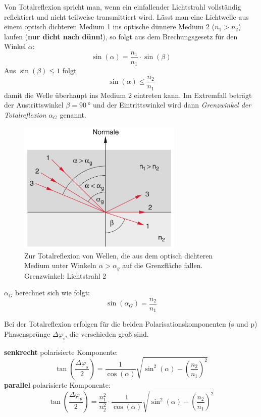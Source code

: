\documentclass[a4paper, 11pt, ngerman, parskip=half]{scrartcl}
\begin{document}
Von Totalreflexion spricht man, wenn ein einfallender Lichtstrahl vollständig reflektiert und nicht teilweise transmittiert wird.
Lässt man eine Lichtwelle aus einem optisch dichteren Medium 1 ins optische dünnere Medium 2 ($n_1 > n_2$) laufen (\textbf{nur dicht nach dünn!}), so folgt aus dem Brechungsgesetz für den Winkel $\alpha$:
%
\[\sin(\alpha) = \frac{n_1}{n_1} \cdot \sin(\beta)\]
%
Aus $\sin(\beta) \leq 1$ folgt
%
\[\sin(\alpha) \leq \frac{n_2}{n_1}\]
%
damit die Welle überhaupt ins Medium 2 eintreten kann. Im Extremfall beträgt der Austrittswinkel $\beta = \SI{90}{\degree}$ und der Eintrittswinkel wird dann \textit{Grenzwinkel der Totalreflexion} $\alpha_G$ genannt.
%
\begin{figure}[H]
    \centering
    \begin{samepage}
        \includegraphics[width=0.7\textwidth]{image/15/totalreflexion.jpg}
        \caption{Zur Totalreflexion von Wellen, die aus dem optisch
        dichteren Medium unter Winkeln $\alpha > \alpha_g$ auf die Grenzfläche fallen. Grenzwinkel: Lichtstrahl 2}
        \label{fig:totalreflexion}
    \end{samepage}
\end{figure}
%
$\alpha_G$ berechnet sich wie folgt:
\begin{equation}
    \label{eq:grenzwinkel_totalreflexion}
    \sin(\alpha_G) = \frac{n_2}{n_1}
\end{equation}

Bei der Totalreflexion erfolgen für die beiden Polarisationskomponenten (s und p) Phasensprünge $\Delta \varphi_i$, die verschieden groß sind.

\textbf{senkrecht} polarisierte Komponente:
%
\begin{equation}
    \label{eq:totalreflexion_s_polarisation}
    \tan(\frac{\Delta \varphi_s}{2}) = \frac{1}{\cos(\alpha)} \sqrt{\sin^2(\alpha) - \left(\frac{n_2}{n_1}\right)^2}
\end{equation}
%
\textbf{parallel} polarisierte Komponente:
%
\begin{equation}
    \label{eq:totalreflexion_p_polarisation}
    \tan(\frac{\Delta \varphi_p}{2}) = \frac{n_1^2}{n_2^2} \cdot \frac{1}{\cos(\alpha)} \sqrt{\sin^2(\alpha) - \left(\frac{n_2}{n_1}\right)^2}
\end{equation}
\end{document}
